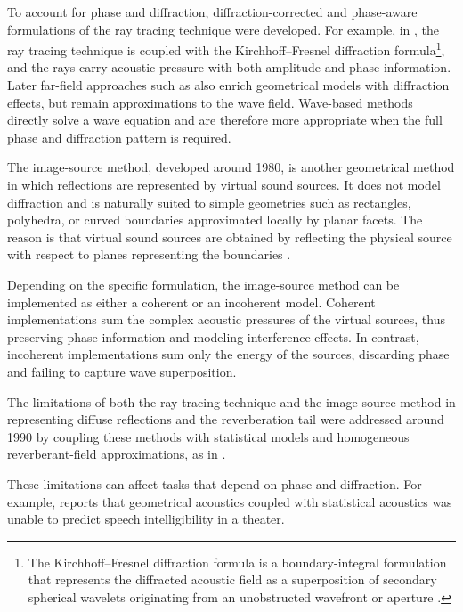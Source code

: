 \documentclass{Configuration_Files/PoliMi3i_thesis}
\newif\ifshowthesischanges
\DeclareRobustCommand{\thesischange}[2]{%
    \ifshowthesischanges
        \textcolor{#1}{#2}%
    \else
        #2%
    \fi
}
\def\thesischange#1#2{#2}%
\begin{document}
To account for phase and diffraction, diffraction-corrected and phase-aware formulations of the ray tracing technique were developed. For example, in \cite{deregowski_theory_1983}, the ray tracing technique is coupled with the Kirchhoff--Fresnel diffraction formula\footnote{\thesischange{red}{The Kirchhoff--Fresnel diffraction formula is a boundary-integral formulation that represents the diffracted acoustic field as a superposition of secondary spherical wavelets originating from an unobstructed wavefront or aperture \citep{deregowski_theory_1983}.}}, and the rays carry acoustic pressure with both amplitude and phase information. Later far-field approaches such as \cite{nakagawa_improved_1993} also enrich geometrical models with diffraction effects, but remain approximations to the wave field. Wave-based methods directly solve a wave equation and are therefore more appropriate when the full phase and diffraction pattern is required.

The image-source method, developed around 1980, is another geometrical method in which reflections are represented by virtual sound sources. It does not model diffraction and is naturally suited to simple geometries such as rectangles, polyhedra, or curved boundaries approximated locally by planar facets. The reason is that virtual sound sources are obtained by reflecting the physical source with respect to planes representing the boundaries \citep{allen_image_1979,borish_extension_1984,kirszenstein_image_1984,heinz_binaural_1993}.

Depending on the specific formulation, the image-source method can be implemented as either a coherent or an incoherent model. Coherent implementations sum the complex acoustic pressures of the virtual sources, thus preserving phase information and modeling interference effects. In contrast, incoherent implementations sum only the energy of the sources, discarding phase and failing to capture wave superposition.

The limitations of both the ray tracing technique and the image-source method in representing diffuse reflections and the reverberation tail were addressed around 1990 by coupling these methods with statistical models and homogeneous reverberant-field approximations, as in \cite{rindel_computer_1992,naylor_odeonanother_1993,maercke_prediction_1993,heinz_binaural_1993}.

These limitations can affect tasks that depend on phase and diffraction. For example, \cite{kleiner_speech_1978} reports that geometrical acoustics coupled with statistical acoustics was unable to predict speech intelligibility in a theater.
\end{document}
